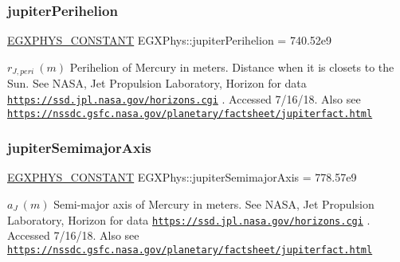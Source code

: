 \subsubsection{\texorpdfstring{jupiter\+Perihelion}{jupiterPerihelion}}
{\footnotesize\ttfamily \mbox{\hyperlink{group___e_g_x_phys-_constants-_macros_ga76980d288494ce1714c9ac68a95ba702}{E\+G\+X\+P\+H\+Y\+S\+\_\+\+C\+O\+N\+S\+T\+A\+NT}} E\+G\+X\+Phys\+::jupiter\+Perihelion = 740.\+52e9}

$ r_{J,peri} \ (m)$ Perihelion of Mercury in meters. Distance when it is closets to the Sun. See N\+A\+SA, Jet Propulsion Laboratory, Horizon for data \href{https://ssd.jpl.nasa.gov/horizons.cgi}{\tt https\+://ssd.\+jpl.\+nasa.\+gov/horizons.\+cgi} . Accessed 7/16/18. Also see \href{https://nssdc.gsfc.nasa.gov/planetary/factsheet/jupiterfact.html}{\tt https\+://nssdc.\+gsfc.\+nasa.\+gov/planetary/factsheet/jupiterfact.\+html} \mbox{\label{group___e_g_x_phys-_constants-_astrophysics-_solar_system-_mercury-_orbit_ga7cfafd3fa5a3ac5018c0be84dbb6600c}} 
\subsubsection{\texorpdfstring{jupiter\+Semimajor\+Axis}{jupiterSemimajorAxis}}
{\footnotesize\ttfamily \mbox{\hyperlink{group___e_g_x_phys-_constants-_macros_ga76980d288494ce1714c9ac68a95ba702}{E\+G\+X\+P\+H\+Y\+S\+\_\+\+C\+O\+N\+S\+T\+A\+NT}} E\+G\+X\+Phys\+::jupiter\+Semimajor\+Axis = 778.\+57e9}

$ a_{J} \ (m)$ Semi-\/major axis of Mercury in meters. See N\+A\+SA, Jet Propulsion Laboratory, Horizon for data \href{https://ssd.jpl.nasa.gov/horizons.cgi}{\tt https\+://ssd.\+jpl.\+nasa.\+gov/horizons.\+cgi} . Accessed 7/16/18. Also see \href{https://nssdc.gsfc.nasa.gov/planetary/factsheet/jupiterfact.html}{\tt https\+://nssdc.\+gsfc.\+nasa.\+gov/planetary/factsheet/jupiterfact.\+html} \mbox{\label{group___e_g_x_phys-_constants-_astrophysics-_solar_system-_mercury-_orbit_ga96e12fb8636fcff0c503d7765bc1e192}} 
